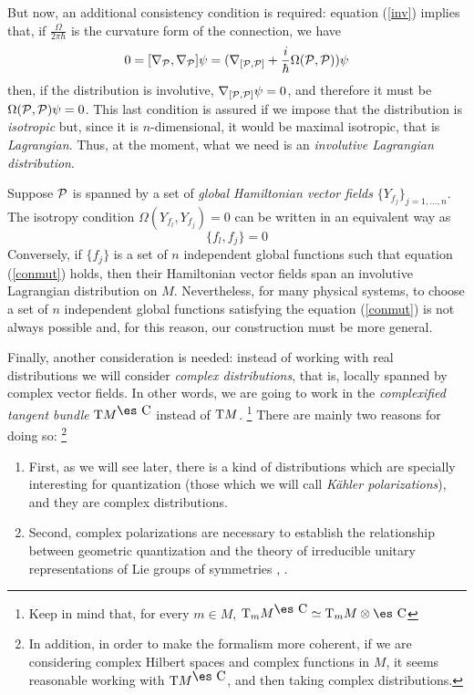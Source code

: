 \documentclass[12pt]{article}
\def\beq{\begin{equation}}
\def\eeq{\end{equation}}
\def\dst{\(}
\def\P{{\cal P}}
\def\Complex{\mbox{\es C}}
\def\Tan{{\rm T}}
\begin{document}
But now, an additional consistency condition is required:
equation (\ref{inv}) implies that,
if \dst\frac{\Omega}{2\pi\hbar}\)
is the curvature form of the connection, we have
$$
0 = [\nabla_\P ,\nabla_\P ]\psi =
(\nabla_{[\P ,\P ]} + \frac{i}{\hbar}\Omega (\P ,\P ))\psi
$$
then, if the distribution is involutive,
$\nabla_{[\P ,\P ]}\psi = 0$,
and therefore it must be
$\Omega (\P ,\P )\psi = 0$.
This last condition is assured if we impose that
the distribution is {\it isotropic}
but, since it is $n$-dimensional,
it would be maximal isotropic, that is {\it Lagrangian}.
Thus, at the moment, what we need is an
{\it involutive Lagrangian distribution}.

Suppose $\P$ is spanned by a set of
{\it global Hamiltonian vector fields\/}
$\{ Y_{f_j} \}_{j=1,\ldots ,n}$.
The isotropy condition
$\Omega (Y_{f_l},Y_{f_j}) = 0$
can be written in an equivalent way as
\beq
\{ f_l,f_j \} = 0
\label{conmut}
\eeq
Conversely, if $\{ f_j \}$ is a set of $n$
independent global functions such that equation
(\ref{conmut}) holds, then their Hamiltonian vector fields
span an involutive Lagrangian distribution on $M$.
Nevertheless, for many physical systems, to choose a set of
$n$ independent global functions satisfying the equation
(\ref{conmut}) is not always possible
and, for this reason, our construction must be more general.

Finally, another consideration is needed:
instead of working with real distributions
we will consider
{\it complex distributions},
that is, locally spanned by complex vector fields.
In other words, we are going to work in the
{\it complexified tangent bundle\/}
$\Tan M^{\Complex}$
instead of $\Tan M$.%
\footnote
{Keep in mind that, for every $m \in M$,
$\Tan_m M^{\Complex} \simeq \Tan_m M \otimes \Complex$}
There are mainly two reasons for doing so:%
\footnote{
In addition, in order to make the formalism more coherent,
if we are considering complex Hilbert spaces and
complex functions in $M$,
it seems reasonable working with $\Tan M^{\Complex}$,
and then taking complex distributions.}
\begin{enumerate}
\item
First, as we will see later, there is a kind of distributions which are
specially interesting for quantization
(those which we will call {\it K\"ahler polarizations}),
and they are complex distributions.
\item
Second, complex polarizations are necessary to establish the
relationship
between  geometric quantization and
the theory of irreducible unitary representations
of Lie groups of symmetries
\cite{Ki-gq}, \cite{Wn-77}.
\end{enumerate}
\end{document}
